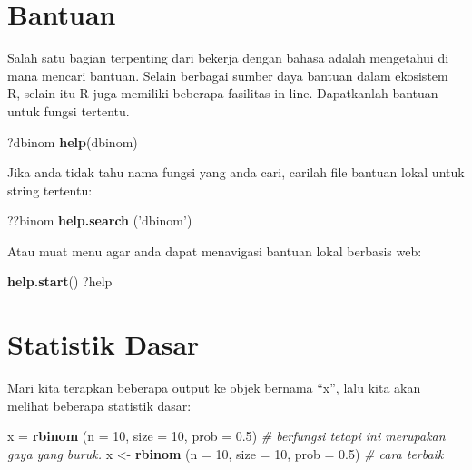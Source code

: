 \documentclass[
]{book}
\newenvironment{Shaded}{\begin{snugshade}}{\end{snugshade}}
\newcommand{\CommentTok}[1]{\textcolor[rgb]{0.56,0.35,0.01}{\textit{#1}}}
\newcommand{\DataTypeTok}[1]{\textcolor[rgb]{0.13,0.29,0.53}{#1}}
\newcommand{\DecValTok}[1]{\textcolor[rgb]{0.00,0.00,0.81}{#1}}
\newcommand{\FloatTok}[1]{\textcolor[rgb]{0.00,0.00,0.81}{#1}}
\newcommand{\KeywordTok}[1]{\textcolor[rgb]{0.13,0.29,0.53}{\textbf{#1}}}
\newcommand{\NormalTok}[1]{#1}
\newcommand{\StringTok}[1]{\textcolor[rgb]{0.31,0.60,0.02}{#1}}
\begin{document}
\hypertarget{bantuan}{%
\section{Bantuan}\label{bantuan}}

Salah satu bagian terpenting dari bekerja dengan bahasa adalah mengetahui di mana mencari bantuan. Selain berbagai sumber daya bantuan dalam ekosistem R, selain itu R juga memiliki beberapa fasilitas in-line. Dapatkanlah bantuan untuk fungsi tertentu.

\begin{Shaded}
\begin{Highlighting}[]
\NormalTok{?dbinom}
\KeywordTok{help}\NormalTok{(dbinom)}
\end{Highlighting}
\end{Shaded}

Jika anda tidak tahu nama fungsi yang anda cari, carilah file bantuan lokal untuk string tertentu:

\begin{Shaded}
\begin{Highlighting}[]
\NormalTok{??binom}
\KeywordTok{help.search}\NormalTok{ (}\StringTok{'dbinom'}\NormalTok{)}
\end{Highlighting}
\end{Shaded}

Atau muat menu agar anda dapat menavigasi bantuan lokal berbasis web:

\begin{Shaded}
\begin{Highlighting}[]
\KeywordTok{help.start}\NormalTok{()}
\NormalTok{?help}
\end{Highlighting}
\end{Shaded}

\hypertarget{statistik-dasar}{%
\section{Statistik Dasar}\label{statistik-dasar}}

Mari kita terapkan beberapa output ke objek bernama ``x'', lalu kita akan melihat beberapa statistik dasar:

\begin{Shaded}
\begin{Highlighting}[]
\NormalTok{x =}\StringTok{ }\KeywordTok{rbinom}\NormalTok{ (}\DataTypeTok{n =} \DecValTok{10}\NormalTok{, }\DataTypeTok{size =} \DecValTok{10}\NormalTok{, }\DataTypeTok{prob =} \FloatTok{0.5}\NormalTok{) 	    }\CommentTok{# berfungsi tetapi ini merupakan gaya yang buruk.}
\NormalTok{x <-}\StringTok{ }\KeywordTok{rbinom}\NormalTok{ (}\DataTypeTok{n =} \DecValTok{10}\NormalTok{, }\DataTypeTok{size =} \DecValTok{10}\NormalTok{, }\DataTypeTok{prob =} \FloatTok{0.5}\NormalTok{)	    }\CommentTok{# cara terbaik}
\end{Highlighting}
\end{Shaded}
\end{document}
